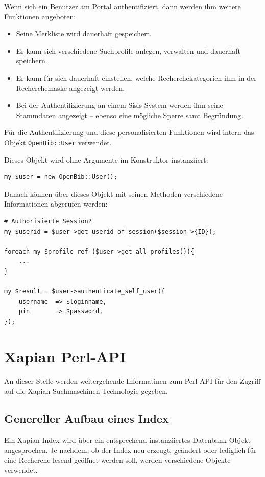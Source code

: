 \documentclass[11pt, twoside, a4paper, BCOR8mm, DIV12, bibtotoc,idxtotoc]{scrbook}
\begin{document}
Wenn sich ein Benutzer am Portal authentifiziert, dann werden ihm
weitere Funktionen angeboten:

\begin{itemize}
\item Seine Merkliste wird dauerhaft gespeichert.
\item Er kann sich verschiedene Suchprofile anlegen, verwalten und
  dauerhaft speichern.
\item Er kann für sich dauerhaft einstellen, welche
  Recherchekategorien ihm in der Recherchemaske angezeigt werden.
\item Bei der Authentifizierung an einem Sisis-System werden ihm seine
  Stammdaten angezeigt -- ebenso eine mögliche Sperre samt Begründung.
\end{itemize}

Für die Authentifizierung und diese personalisierten Funktionen wird
intern das Objekt \texttt{OpenBib::User} verwendet.

Dieses Objekt wird ohne Argumente im Konstruktor instanziiert:

\begin{verbatim}
my $user = new OpenBib::User();
\end{verbatim}

Danach können über dieses Objekt mit seinen Methoden verschiedene
Informationen abgerufen werden:

\begin{verbatim}
# Authorisierte Session?
my $userid = $user->get_userid_of_session($session->{ID});

foreach my $profile_ref ($user->get_all_profiles()){
    ...
}

my $result = $user->authenticate_self_user({
    username  => $loginname,
    pin       => $password,
});
\end{verbatim}

\appendix


\chapter{Xapian Perl-API}

An dieser Stelle werden weitergehende Informatinen zum Perl-API für
den Zugriff auf die Xapian Suchmaschinen-Technologie gegeben.


\section{Genereller Aufbau eines Index}
Ein Xapian-Index wird über ein entsprechend instanziiertes
Datenbank-Objekt angesprochen. Je nachdem, ob der Index neu erzeugt,
geändert oder lediglich für eine Recherche lesend geöffnet werden
soll, werden verschiedene Objekte verwendet.
\end{document}
